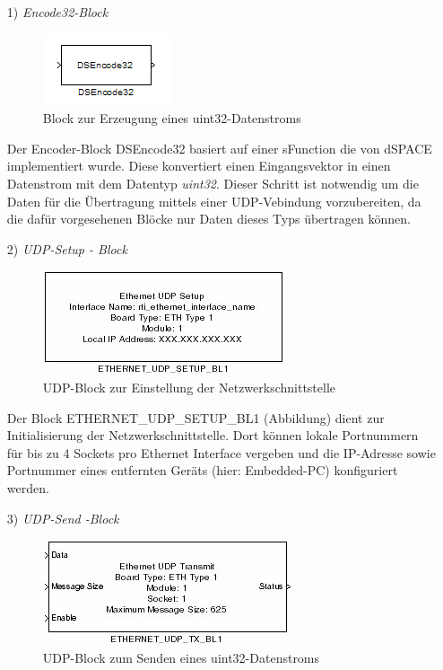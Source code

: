 \documentclass[fontsize = 12pt, paper = a4]{scrreprt}
\begin{document}
\begin{itemize}

\item[1)] \textit{Encode32-Block}

\begin{figure}[h]
\centering
\includegraphics[scale = 1]{dsencode32}
\caption{Block zur Erzeugung eines uint32-Datenstroms}
\end{figure} 

Der Encoder-Block DSEncode32 basiert auf einer sFunction die von dSPACE implementiert wurde. Diese konvertiert einen Eingangsvektor in einen Datenstrom mit dem Datentyp \textit{uint32}. Dieser Schritt ist notwendig um die Daten für die Übertragung mittels einer UDP-Vebindung vorzubereiten, da die dafür vorgesehenen Blöcke nur Daten dieses Typs übertragen können. 

\item[2)] \textit{UDP-Setup - Block} 

\begin{figure}[h]
\centering
\includegraphics[scale = 1]{ethernet_udp_setup_block}
\caption{UDP-Block zur Einstellung der Netzwerkschnittstelle}
\end{figure}

Der Block ETHERNET\_UDP\_SETUP\_BL1 (\*Abbildung\*) dient zur Initialisierung der Netzwerkschnittstelle. Dort können lokale Portnummern für bis zu 4 Sockets pro Ethernet Interface vergeben und die IP-Adresse sowie Portnummer eines entfernten Geräts (hier: Embedded-PC) konfiguriert werden.

\item[3)] \textit{UDP-Send -Block}

\begin{figure}[h]
\centering
\includegraphics[scale = 1]{ethernet_udp_send_block.png}
\caption{UDP-Block zum Senden eines uint32-Datenstroms}
\end{figure}


\end{itemize}
\end{document}
